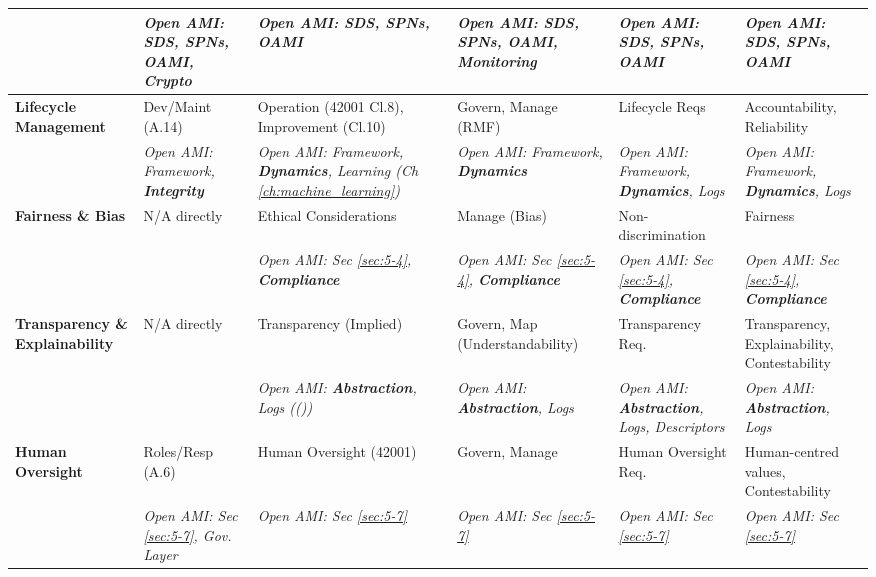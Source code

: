\documentclass[12pt,a4paper]{report}
\renewcommand{\citep}[1]{\textit{\scriptsize{(\cite{#1})}}}
\newcommand{\Integrity}{\textbf{Integrity}}
\newcommand{\Abstraction}{\textbf{Abstraction}}
\newcommand{\Dynamics}{\textbf{Dynamics}}
\begin{document}
\begin{table}[htbp]
{\begin{tabular}{p{2.5cm}|p{2.5cm}|p{2.5cm}|p{2.5cm}|p{2.5cm}|p{2.5cm}@{}}
				& \textit{\scriptsize Open AMI: SDS, SPNs, OAMI, Crypto} & \textit{\scriptsize Open AMI: SDS, SPNs, OAMI} & \textit{\scriptsize Open AMI: SDS, SPNs, OAMI, Monitoring} & \textit{\scriptsize Open AMI: SDS, SPNs, OAMI} & \textit{\scriptsize Open AMI: SDS, SPNs, OAMI} \\
				\midrule
				\textbf{Lifecycle Management} & \scriptsize Dev/Maint (A.14) & \scriptsize Operation (42001 Cl.8), Improvement (Cl.10) & \scriptsize Govern, Manage (RMF) & \scriptsize Lifecycle Reqs & \scriptsize Accountability, Reliability \\
				& \textit{\scriptsize Open AMI: Framework, \Integrity} & \textit{\scriptsize Open AMI: Framework, \Dynamics, Learning (Ch \ref{ch:machine_learning})} & \textit{\scriptsize Open AMI: Framework, \Dynamics} & \textit{\scriptsize Open AMI: Framework, \Dynamics, Logs} & \textit{\scriptsize Open AMI: Framework, \Dynamics, Logs} \\
				\midrule
				\textbf{Fairness \& Bias} & \scriptsize N/A directly & \scriptsize Ethical Considerations & \scriptsize Manage (Bias) & \scriptsize Non-discrimination & \scriptsize Fairness \\
				& & \textit{\scriptsize Open AMI: Sec \ref{sec:5-4}, \textbf{Compliance}} & \textit{\scriptsize Open AMI: Sec \ref{sec:5-4}, \textbf{Compliance}} & \textit{\scriptsize Open AMI: Sec \ref{sec:5-4}, \textbf{Compliance}} & \textit{\scriptsize Open AMI: Sec \ref{sec:5-4}, \textbf{Compliance}} \\
				\midrule
				\textbf{Transparency \& Explainability} & \scriptsize N/A directly & \scriptsize Transparency (Implied) & \scriptsize Govern, Map (Understandability) & \scriptsize Transparency Req. & \scriptsize Transparency, Explainability, Contestability \\
				& & \textit{\scriptsize Open AMI: \Abstraction, Logs (\citep{Anthropic_Decompose_2023})} & \textit{\scriptsize Open AMI: \Abstraction, Logs} & \textit{\scriptsize Open AMI: \Abstraction, Logs, Descriptors} & \textit{\scriptsize Open AMI: \Abstraction, Logs} \\
				\midrule
				\textbf{Human Oversight} & \scriptsize Roles/Resp (A.6) & \scriptsize Human Oversight (42001) & \scriptsize Govern, Manage & \scriptsize Human Oversight Req. & \scriptsize Human-centred values, Contestability \\
				& \textit{\scriptsize Open AMI: Sec \ref{sec:5-7}, Gov. Layer} & \textit{\scriptsize Open AMI: Sec \ref{sec:5-7}} & \textit{\scriptsize Open AMI: Sec \ref{sec:5-7}} & \textit{\scriptsize Open AMI: Sec \ref{sec:5-7}} & \textit{\scriptsize Open AMI: Sec \ref{sec:5-7}} \\

\end{tabular}}
\end{table}
\end{document}
